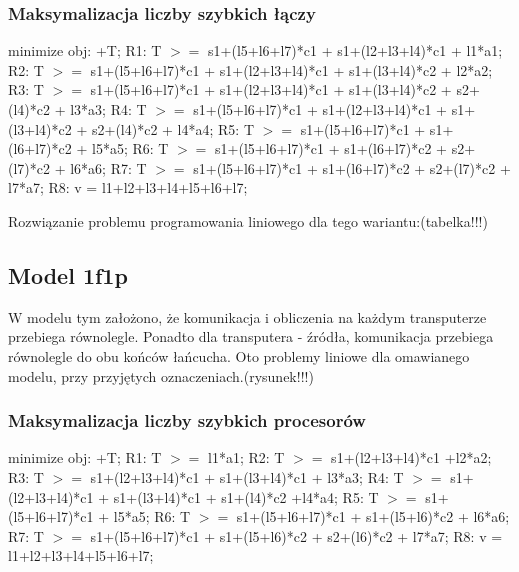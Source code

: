 \documentclass[a4paper,11pt, titlepage]{article}
\begin{document}
\subsubsection{Maksymalizacja liczby szybkich łączy}
\begin{flushleft}

minimize obj: +T;\linebreak
\linebreak
R1: T $>=$ s1+(l5+l6+l7)*c1 + s1+(l2+l3+l4)*c1 + l1*a1;\linebreak
R2: T $>=$ s1+(l5+l6+l7)*c1 + s1+(l2+l3+l4)*c1 + s1+(l3+l4)*c2 + l2*a2;\linebreak
R3: T $>=$ s1+(l5+l6+l7)*c1 + s1+(l2+l3+l4)*c1 + s1+(l3+l4)*c2 + s2+(l4)*c2 + l3*a3;\linebreak
R4: T $>=$ s1+(l5+l6+l7)*c1 + s1+(l2+l3+l4)*c1 + s1+(l3+l4)*c2 + s2+(l4)*c2 + l4*a4;\linebreak
R5: T $>=$ s1+(l5+l6+l7)*c1 + s1+(l6+l7)*c2 + l5*a5;\linebreak
R6: T $>=$ s1+(l5+l6+l7)*c1 + s1+(l6+l7)*c2 + s2+(l7)*c2 + l6*a6;\linebreak
R7: T $>=$ s1+(l5+l6+l7)*c1 + s1+(l6+l7)*c2 + s2+(l7)*c2 + l7*a7;\linebreak
R8: v = l1+l2+l3+l4+l5+l6+l7;\linebreak
\end{flushleft}

Rozwiązanie problemu programowania liniowego dla tego wariantu:(tabelka!!!)

\subsection{Model 1f1p}
W modelu tym założono, że komunikacja i obliczenia na każdym transputerze przebiega równolegle. Ponadto dla transputera - źródła, komunikacja przebiega równolegle do obu końców łańcucha. Oto problemy liniowe dla omawianego modelu, przy przyjętych oznaczeniach.(rysunek!!!)

\subsubsection{Maksymalizacja liczby szybkich procesorów}
\begin{flushleft}
minimize obj: +T;\linebreak
\linebreak
R1: T $>=$ l1*a1;\linebreak
R2: T $>=$ s1+(l2+l3+l4)*c1 +l2*a2;\linebreak
R3: T $>=$ s1+(l2+l3+l4)*c1 + s1+(l3+l4)*c1 + l3*a3;\linebreak
R4: T $>=$ s1+(l2+l3+l4)*c1 + s1+(l3+l4)*c1 + s1+(l4)*c2 +l4*a4;\linebreak
R5: T $>=$ s1+(l5+l6+l7)*c1 + l5*a5;\linebreak
R6: T $>=$ s1+(l5+l6+l7)*c1 + s1+(l5+l6)*c2 + l6*a6;\linebreak
R7: T $>=$ s1+(l5+l6+l7)*c1 + s1+(l5+l6)*c2 +  s2+(l6)*c2 + l7*a7;\linebreak
R8: v = l1+l2+l3+l4+l5+l6+l7;\linebreak
\end{flushleft}
\end{document}
